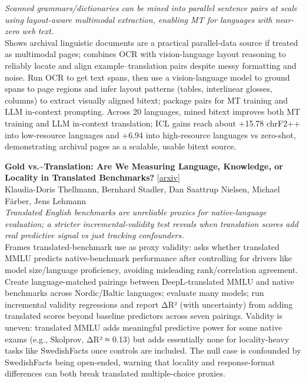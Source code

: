 \documentclass[12pt,letterpaper]{article}
\begin{document}
{\small\textit{Scanned grammars/dictionaries can be mined into parallel sentence pairs at scale using layout-aware multimodal extraction, enabling MT for languages with near-zero web text.}}\\[1pt]
{\footnotesize Shows archival linguistic documents are a practical parallel-data source if treated as multimodal pages; combines OCR with vision-language layout reasoning to reliably locate and align example--translation pairs despite messy formatting and noise. Run OCR to get text spans, then use a vision-language model to ground spans to page regions and infer layout patterns (tables, interlinear glosses, columns) to extract visually aligned bitext; package pairs for MT training and LLM in-context prompting. Across 20 languages, mined bitext improves both MT training and LLM in-context translation; ICL gains reach about +15.78 chrF2++ into low-resource languages and +6.94 into high-resource languages vs zero-shot, demonstrating archival pages as a scalable, usable bitext source.}

\medskip

{\small\textbf{Gold vs.\textasciitilde{}Translation: Are We Measuring Language, Knowledge, or Locality in Translated Benchmarks?}} {\scriptsize[\href{https://arxiv.org/abs/2610.38788}{arxiv}]}\\
{\scriptsize Klaudia-Doris Thellmann, Bernhard Stadler, Dan Saattrup Nielsen, Michael F\"arber, Jens Lehmann}\\

{\small\textit{Translated English benchmarks are unreliable proxies for native-language evaluation; a stricter incremental-validity test reveals when translation scores add real predictive signal vs just tracking confounders.}}\\[1pt]
{\footnotesize Frames translated-benchmark use as proxy validity: asks whether translated MMLU predicts native-benchmark performance after controlling for drivers like model size/language proficiency, avoiding misleading rank/correlation agreement. Create language-matched pairings between DeepL-translated MMLU and native benchmarks across Nordic/Baltic languages; evaluate many models; run incremental validity regressions and report ΔR² (with uncertainty) from adding translated scores beyond baseline predictors across seven pairings. Validity is uneven: translated MMLU adds meaningful predictive power for some native exams (e.g., Skolprov, ΔR² ≈ 0.13) but adds essentially none for locality-heavy tasks like SwedishFacts once controls are included. The null case is confounded by SwedishFacts being open-ended, warning that locality and response-format differences can both break translated multiple-choice proxies.}
\end{document}
